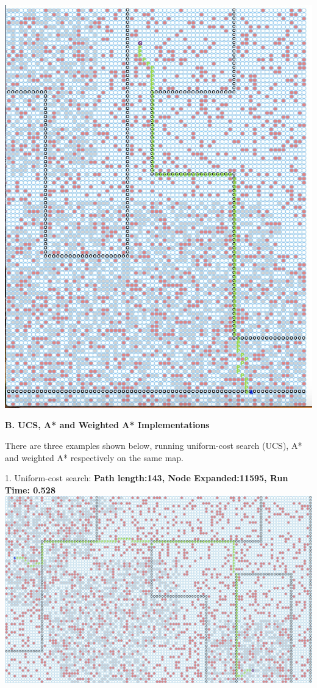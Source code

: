 \documentclass[12pt, letterpaper]{article}
\begin{document}
\includegraphics[scale=0.45]{"a-map1-4"}

\medskip

\pagebreak %

\noindent \textbf{B. UCS, A* and Weighted A* Implementations}

There are three examples shown below, running uniform-cost search (UCS), A* and weighted A* respectively on the same map.

1. Uniform-cost search:\newline
\medskip
\textbf{Path length:143, Node Expanded:11595,	Run Time: 0.528}\newline
\noindent \includegraphics[scale=0.4]{"b-map5-1-u"}\newline
\end{document}
